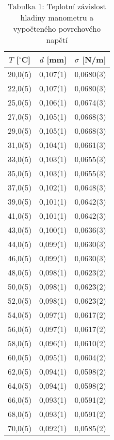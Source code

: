 \documentclass{prepareprotokol} %
\begin{document}
\begin{table}[h!]
\centering
\caption{Tabulka 1: Teplotní závislost hladiny manometru a vypočteného povrchového napětí}

\begin{tabular}{|c|c|c|}
\hline
\textbf{$T$ [$^\circ$C]} & \textbf{$d$ [mm]} & \textbf{$\sigma$ [N/m]} \\
\hline
20{,}0(5) & 0{,}107(1) & 0{,}0680(3) \\
22{,}0(5) & 0{,}107(1) & 0{,}0680(3) \\
25{,}0(5) & 0{,}106(1) & 0{,}0674(3) \\
27{,}0(5) & 0{,}105(1) & 0{,}0668(3) \\
29{,}0(5) & 0{,}105(1) & 0{,}0668(3) \\
31{,}0(5) & 0{,}104(1) & 0{,}0661(3) \\
33{,}0(5) & 0{,}103(1) & 0{,}0655(3) \\
35{,}0(5) & 0{,}103(1) & 0{,}0655(3) \\
37{,}0(5) & 0{,}102(1) & 0{,}0648(3) \\
39{,}0(5) & 0{,}101(1) & 0{,}0642(3) \\
41{,}0(5) & 0{,}101(1) & 0{,}0642(3) \\
43{,}0(5) & 0{,}100(1) & 0{,}0636(3) \\
44{,}0(5) & 0{,}099(1) & 0{,}0630(3) \\
46{,}0(5) & 0{,}099(1) & 0{,}0630(3) \\
48{,}0(5) & 0{,}098(1) & 0{,}0623(2) \\
50{,}0(5) & 0{,}098(1) & 0{,}0623(2) \\
52{,}0(5) & 0{,}098(1) & 0{,}0623(2) \\
54{,}0(5) & 0{,}097(1) & 0{,}0617(2) \\
56{,}0(5) & 0{,}097(1) & 0{,}0617(2) \\
58{,}0(5) & 0{,}096(1) & 0{,}0610(2) \\
60{,}0(5) & 0{,}095(1) & 0{,}0604(2) \\
62{,}0(5) & 0{,}094(1) & 0{,}0598(2) \\
64{,}0(5) & 0{,}094(1) & 0{,}0598(2) \\
66{,}0(5) & 0{,}093(1) & 0{,}0591(2) \\
68{,}0(5) & 0{,}093(1) & 0{,}0591(2) \\
70{,}0(5) & 0{,}092(1) & 0{,}0585(2) \\
\hline
\end{tabular}
\end{table}
\end{document}
